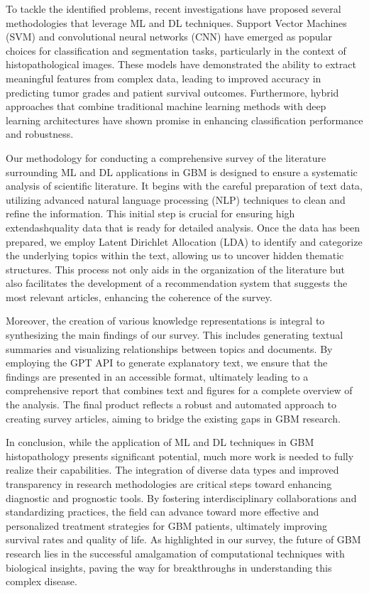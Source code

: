 \documentclass[runningheads]{llncs}
\begin{document}
To tackle the identified problems, recent investigations have proposed several methodologies that leverage ML and DL techniques. Support Vector Machines (SVM) and convolutional neural networks (CNN) have emerged as popular choices for classification and segmentation tasks, particularly in the context of histopathological images. These models have demonstrated the ability to extract meaningful features from complex data, leading to improved accuracy in predicting tumor grades and patient survival outcomes. Furthermore, hybrid approaches that combine traditional machine learning methods with deep learning architectures have shown promise in enhancing classification performance and robustness.

Our methodology for conducting a comprehensive survey of the literature surrounding ML and DL applications in GBM is designed to ensure a systematic analysis of scientific literature. It begins with the careful preparation of text data, utilizing advanced natural language processing (NLP) techniques to clean and refine the information. This initial step is crucial for ensuring high	extendash{}quality data that is ready for detailed analysis. Once the data has been prepared, we employ Latent Dirichlet Allocation (LDA) to identify and categorize the underlying topics within the text, allowing us to uncover hidden thematic structures. This process not only aids in the organization of the literature but also facilitates the development of a recommendation system that suggests the most relevant articles, enhancing the coherence of the survey.

Moreover, the creation of various knowledge representations is integral to synthesizing the main findings of our survey. This includes generating textual summaries and visualizing relationships between topics and documents. By employing the GPT API to generate explanatory text, we ensure that the findings are presented in an accessible format, ultimately leading to a comprehensive report that combines text and figures for a complete overview of the analysis. The final product reflects a robust and automated approach to creating survey articles, aiming to bridge the existing gaps in GBM research.

In conclusion, while the application of ML and DL techniques in GBM histopathology presents significant potential, much more work is needed to fully realize their capabilities. The integration of diverse data types and improved transparency in research methodologies are critical steps toward enhancing diagnostic and prognostic tools. By fostering interdisciplinary collaborations and standardizing practices, the field can advance toward more effective and personalized treatment strategies for GBM patients, ultimately improving survival rates and quality of life. As highlighted in our survey, the future of GBM research lies in the successful amalgamation of computational techniques with biological insights, paving the way for breakthroughs in understanding this complex disease.
\end{document}

